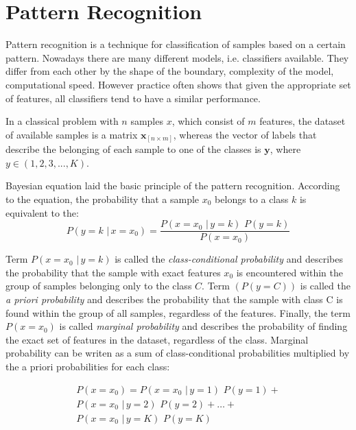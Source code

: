 \documentclass{article}
\begin{document}



\section{Pattern Recognition}

Pattern recognition is a technique for classification of samples based on a certain pattern. Nowadays there are many different models, i.e. classifiers available. They differ from each other by the shape of the boundary, complexity of the model, computational speed. However practice often shows that given the appropriate set of features,  all classifiers tend to have a similar performance.

In a classical problem with $n$ samples $x$, which consist of $m$ features, the dataset of available samples is a matrix $\mathbf{x}_{[n \times m]}$, whereas the vector of labels that describe the belonging of each sample to one of the classes is $\mathbf{y}$, where $y \in (1,2,3,...,K)$.

Bayesian equation laid the basic principle of the pattern recognition. According to the equation, the probability that a sample $x_0$ belongs to a class $k$ is equivalent to the: 
\begin{equation} 
P(y=k \,\, | \, x=x_0) = \frac{P(x=x_0  \,\, | \, y=k) \,\,P(y=k)} {P(x=x_0)}
\end{equation}

Term $P(x=x_0  \,\, | \, y=k)$ is called the \emph{class-conditional probability} and describes the probability that the sample with exact features $x_0$ is encountered within the group of samples belonging only to the class $C$. Term $(P(y=C))$ is called the \emph{a priori probability} and describes the probability that the sample with class C is found within the group of all samples, regardless of the features. Finally, the term $P(x=x_0)$ is called \emph{marginal probability} and describes the probability of finding the exact set of features in the dataset, regardless of the class. Marginal probability can be writen as a sum of class-conditional probabilities multiplied by the a priori probabilities for each class:

\begin{equation}
\begin{split}
P(x=x_0) = P(x=x_0  \,\, | \, y=1) \,\,P(y=1) + \\
P(x=x_0  \,\, | \, y=2) \,\,P(y=2) + \dots + \\
P(x=x_0  \,\, | \, y=K) \,\,P(y=K)
\end{split}
\end{equation}
\end{document}
